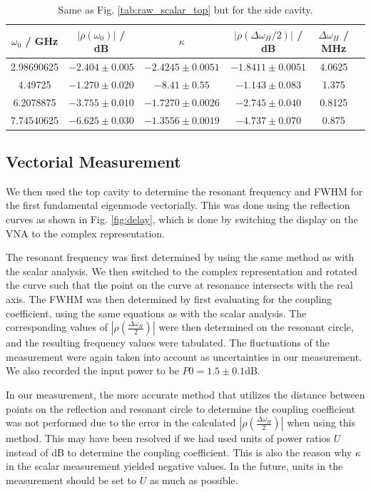 \documentclass[a4paper]{report}
\numberwithin{equation}{section}
\begin{document}
\begin{table}[htb!]
	\centering
	\begin{tabular}{|c|c|c|c|c|c|}
		\hline $\omega_0$ / GHz & $\left| \rho(\omega_0) \right|$ / dB & $\kappa$ & $\left| \rho(\Delta\omega_H / 2) \right|$ / dB & $\Delta\omega_H$ / MHz\\ 
		\hline 2.98690625 & $-2.404 \pm 0.005$ & $-2.4245 \pm 0.0051$ & $-1.8411 \pm 0.0051$ & 4.0625 \\ 
		\hline 4.49725 & $-1.270 \pm 0.020$ & $-8.41 \pm 0.55$ & $-1.143 \pm 0.083$ & 1.375 \\
		\hline 6.2078875 & $-3.755 \pm 0.010$ & $ -1.7270 \pm 0.0026$ & $-2.745 \pm 0.040$ & 0.8125 \\
		\hline 7.74540625 & $-6.625 \pm 0.030$ & $-1.3556 \pm 0.0019$ & $-4.737 \pm 0.070$ & 0.875 \\ 
		\hline
	\end{tabular}
	\caption{Same as Fig. \ref{tab:raw_scalar_top} but for the side cavity. }
	\label{tab:raw_scalar_side}
\end{table}


\subsection{Vectorial Measurement}

We then used the top cavity to determine the resonant frequency and FWHM for the
first fundamental eigenmode vectorially. This was done using the reflection
curves as shown in Fig. \ref{fig:delay}, which is done by switching the display on the VNA to the complex representation. \par 

The resonant frequency was first determined by using the same method as with the
scalar analysis. We then switched to the complex representation and rotated the
curve such that the point on the curve at resonance intersects with the real
axis. The FWHM was then determined by first evaluating for the coupling
coefficient, using the same equations as with the scalar analysis. The
corresponding values of $|\rho(\frac{\Delta\omega_H}{2})|$ were then determined
on the resonant circle, and the resulting frequency values were tabulated.
The fluctuations of the measurement were again taken into account as uncertainties
in our measurement. We also recorded the input power to be $P0 = 1.5 \pm 0.1$dB. \par 

In our measurement, the more accurate method that utilizes the distance between points on the reflection and resonant circle 
to determine the coupling coefficient was not performed due to the error in the calculated $|\rho(\frac{\Delta\omega_H}{2})|$
when using this method. This may have been resolved if we had used units of power ratios $U$ instead of dB to determine the 
coupling coefficient. This is also the reason why $\kappa$ in the scalar measurement yielded negative values. In the future,
units in the measurement should be set to $U$ as much as possible. \par 
\end{document}
